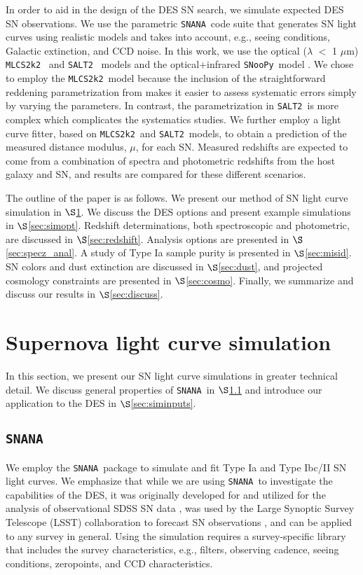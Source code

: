 \documentclass[preprint2]{aastex}    %
\newcommand{\mlcs}{{\tt MLCS2k2}}
\newcommand{\salt}{{\tt SALT2}}
\newcommand{\snoop}{{\tt SNooPy}}
\newcommand{\snana}{{\tt SNANA}}
\begin{document}
In order to aid in the design of the %
DES SN search, we
simulate expected DES SN observations. We use the parametric \snana\ code suite \citep{snana} that 
generates SN light curves using realistic models and takes into account, e.g., seeing 
conditions, Galactic extinction, and CCD noise. In this work, we use the 
optical ($\lambda$ $<$ 1 $\mu$m) \mlcs\ \citep{jha07} 
and \salt\ \citep{guy07} models and the optical+infrared \snoop\ model \citep{bur11}.
We chose to employ the \mlcs\ model because the inclusion of the straightforward reddening parametrization
from \cite{car89} makes it easier to assess systematic errors simply by varying the 
parameters. In contrast, the parametrization in \salt\ is more complex which complicates 
the systematics studies.
We further employ a light curve fitter, based on \mlcs\ and 
\salt\ models, to obtain a prediction of the measured distance modulus, $\mu$, for each SN. 
Measured redshifts are expected to come from a combination of spectra and 
photometric redshifts from the host galaxy and SN, and results are compared for
these different scenarios.

The outline of the paper is as follows. We present our method
of SN light curve simulation in $\S$\ref{sec:sim}.  We
discuss the DES options and present example simulations in
$\S$\ref{sec:simopt}.  
Redshift determinations, both spectroscopic and photometric, are discussed in $\S$\ref{sec:redshift}.
Analysis options are presented in $\S$\ref{sec:specz_anal}.
A study of Type Ia sample purity is presented in 
$\S$\ref{sec:misid}. SN colors and dust extinction 
are discussed in $\S$\ref{sec:dust}, and projected cosmology
constraints are presented in $\S$\ref{sec:cosmo}. Finally, 
we summarize and discuss our results in $\S$\ref{sec:discuss}.

\section{Supernova light curve simulation}\label{sec:sim}
In this section, we present our SN light curve
simulations in greater technical detail. We discuss general
properties of \snana\ in $\S$\ref{sec:snana} and introduce our
application to the DES in $\S$\ref{sec:siminputs}.

\subsection{\snana}\label{sec:snana}
We employ the \snana\ package \citep{snana} to simulate 
and fit Type Ia and Type
Ibc/II SN light curves. We emphasize that while we are
using \snana\ to investigate the capabilities of the DES, it was
originally developed for and utilized for the analysis of observational SDSS
SN data \citep{kes09}, was used by the Large Synoptic
Survey Telescope (LSST) collaboration to forecast SN
observations \citep{lsst}, and can be applied to any survey in general.
Using the simulation requires a survey-specific
library that includes the survey characteristics, e.g.,
filters, observing cadence, seeing conditions, zeropoints, and CCD
characteristics. 
\end{document}
